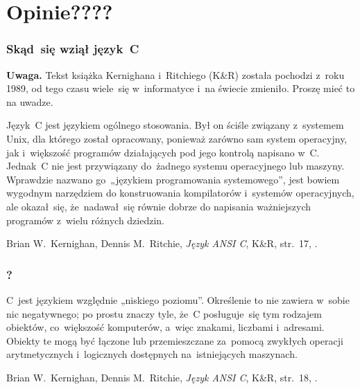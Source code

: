\documentclass[10pt,t]{beamer}
\begin{document}
\section{Opinie????}



\begin{frame}
  \frametitle{Skąd~się wziął język~C}


  \textbf{Uwaga.} Tekst książka Kernighana i~Ritchiego (K\&R) została
  pochodzi z~roku 1989, od tego czasu wiele~się w~informatyce i~na świecie
  zmieniło. Proszę mieć to na uwadze.

  \vspace{1em}





  Język~C jest językiem ogólnego stosowania. Był on ściśle związany
  z~systemem Unix, dla którego został opracowany, ponieważ zarówno sam
  system operacyjny, jak i~większość programów działających pod jego
  kontrolą napisano w~C. Jednak~C nie jest przywiązany do~żadnego
  systemu operacyjnego lub maszyny. Wprawdzie nazwano go~„językiem
  programowania systemowego”, jest bowiem wygodnym narzędziem do
  konstruowania kompilatorów i~systemów operacyjnych, ale okazał~się,
  że~nadawał~się równie dobrze do napisania ważniejszych programów
  z~wielu różnych dziedzin.

  Brian W.~Kernighan, Dennis M.~Ritchie, \textit{Język ANSI C}, K\&R,
  str.~17, \parencite{Kernighan-Ritchie-Jezyk-ANSI-C-Pub-2004}.


\end{frame}





\begin{frame}
  \frametitle{?}


  C~jest językiem względnie „niskiego poziomu”. Określenie to nie zawiera
  w~sobie nic negatywnego; po prostu znaczy tyle, że~C posługuje~się tym
  rodzajem obiektów, co~większość komputerów, a~więc znakami, liczbami
  i~adresami. Obiekty te mogą być łączone lub przemieszczane za~pomocą
  zwykłych operacji arytmetycznych i~logicznych dostępnych na~istniejących
  maszynach.

  Brian W.~Kernighan, Dennis M.~Ritchie, \textit{Język ANSI C}, K\&R,
  str.~18, \parencite{Kernighan-Ritchie-Jezyk-ANSI-C-Pub-2004}.

\end{frame}
\end{document}
